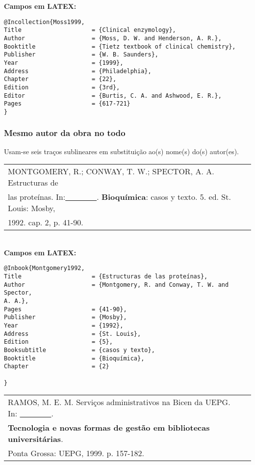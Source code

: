 \textbf{Campos em LATEX:} 
	
\begingroup
\fontsize{10pt}{12pt}\selectfont
\begin{verbatim}
@Incollection{Moss1999,
Title                    = {Clinical enzymology},
Author                   = {Moss, D. W. and Henderson, A. R.},
Booktitle                = {Tietz textbook of clinical chemistry},
Publisher                = {W. B. Saunders},
Year                     = {1999},
Address                  = {Philadelphia},
Chapter                  = {22},
Edition                  = {3rd},
Editor                   = {Burtis, C. A. and Ashwood, E. R.},
Pages                    = {617-721}
}
\end{verbatim}
\endgroup
	
\subsubsection{Mesmo autor da obra no todo}
	
Usam-se seis traços sublineares em substituição ao(s) nome(s) do(s) autor(es). \\
		 
\begin{tabular}{|l|c|} \hline
	MONTGOMERY, R.; CONWAY, T. W.; SPECTOR, A. A. Estructuras de \\las proteínas.  In:\underline{\ \ \ \ \ \ \ \ }. \textbf{Bioquímica}: casos y texto. 5. ed. St. Louis:
	Mosby,                                                       \\1992. cap. 2, p. 41-90.  \\\hline
\end{tabular} \\ 
	
\textbf{Campos em LATEX:} 
	
\begingroup
\fontsize{10pt}{12pt}\selectfont
\begin{verbatim}
@Inbook{Montgomery1992,
Title                    = {Estructuras de las proteínas},
Author                   = {Montgomery, R. and Conway, T. W. and 
Spector, 
A. A.},
Pages                    = {41-90},
Publisher                = {Mosby},
Year                     = {1992},
Address                  = {St. Louis},
Edition                  = {5},
Booksubtitle             = {casos y texto},
Booktitle                = {Bioquímica},
Chapter                  = {2}

}
\end{verbatim}
\endgroup
		 
\begin{tabular}{|l|c|} \hline
	RAMOS, M. E. M. Serviços administrativos na Bicen da UEPG. In: 
	\underline{\ \ \ \ \ \ \ \ }.                                   \\ \textbf{Tecnologia e novas formas de gestão em bibliotecas
	universitárias}.                                               \\Ponta Grossa: UEPG, 1999. p. 157-182.   \\\hline
\end{tabular} \\ 
		 
